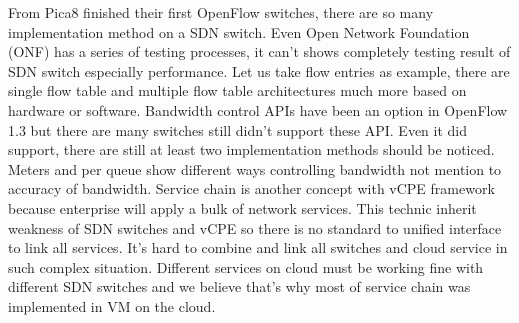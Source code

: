 \documentclass[journal]{IEEEtran}
\begin{document}
From Pica8\cite{pica8-switch} finished their first OpenFlow switches, there are so many implementation method on a SDN switch. Even Open Network Foundation (ONF)\cite{onf} has a series of testing processes, it can’t shows completely testing result of SDN switch especially performance. Let us take flow entries as example, there are single flow table and multiple flow table architectures much more based on hardware or software. Bandwidth control APIs have been an option in OpenFlow 1.3 but there are many switches still didn’t support these API. Even it did support, there are still at least two implementation methods should be noticed. Meters and per queue show different ways controlling bandwidth not mention to accuracy of bandwidth.
Service chain\cite{service-chain} is another concept with vCPE framework because enterprise will apply a bulk of network services. This technic inherit weakness of SDN switches and vCPE so there is no standard to unified interface to link all services. It’s hard to combine and link all switches and cloud service in such complex situation. Different services on cloud must be working fine with different SDN switches and we believe that’s why most of service chain was implemented in VM on the cloud.
\end{document}
